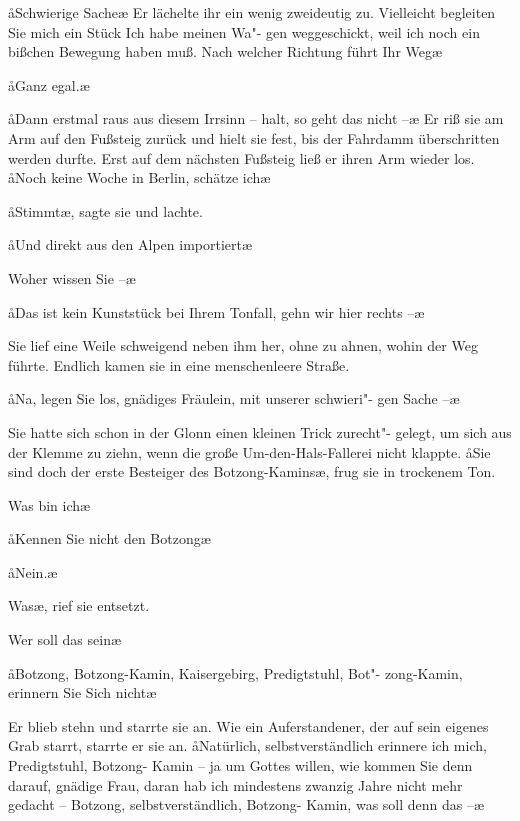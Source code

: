 \aa{}Schwierige Sache\frag{}\ae{} Er lächelte ihr ein wenig zweideutig zu.
\aanah{}Vielleicht begleiten Sie mich ein Stück\frag{} Ich habe meinen Wa"-%
gen weggeschickt, weil ich noch ein bißchen Bewegung haben
muß. Nach welcher Richtung führt Ihr Weg\frag{}\ae{}

\aa{}Ganz egal.\ae{}

\aa{}Dann erstmal raus aus diesem Irrsinn -- halt, so geht das
nicht --\ae{} Er riß sie am Arm auf den Fußsteig zurück und hielt
sie fest, bis der Fahrdamm überschritten werden durfte.
Erst auf dem nächsten Fußsteig ließ er ihren Arm wieder los.
\aa{}Noch keine Woche in Berlin, schätze ich\frag{}\ae{}

\aa{}Stimmt\ae{}, sagte sie und lachte.

\aa{}Und direkt aus den Alpen importiert\frag{}\ae{}

\aanah{}Woher wissen Sie --\ae{}

\aa{}Das ist kein Kunststück bei Ihrem Tonfall, gehn wir hier
rechts --\ae{}

Sie lief eine Weile schweigend neben ihm her, ohne zu ahnen,
wohin der Weg führte. Endlich kamen sie in eine menschenleere
Straße.

\aa{}Na, legen Sie los, gnädiges Fräulein, mit unserer schwieri"-%
gen Sache --\ae{}

Sie hatte sich schon in der Glonn einen kleinen Trick zurecht"-%
gelegt, um sich aus der Klemme zu ziehn, wenn die große
Um-den-Hals-Fallerei nicht klappte. \aa{}Sie sind doch der erste
Besteiger des Botzong-Kamins\ae{}, frug sie in trockenem Ton.

\aanah{}Was bin ich\frag{}\ae{}

\aa{}Kennen Sie nicht den Botzong\frag{}\ae{}

\aa{}Nein.\ae{}

\aanah{}Was\frag{}\ae{}, rief sie entsetzt.

\aanah{}Wer soll das sein\frag{}\ae{}

\aa{}Botzong, Botzong-Kamin, Kaisergebirg, Predigtstuhl, Bot"-%
zong-Kamin, erinnern Sie Sich\eingriff{eS71-1}{Sie Sich ] Sie sich} nicht\frag{}\ae{}

Er blieb stehn und starrte sie an. Wie ein Auferstandener,
der auf sein eigenes Grab starrt, starrte er sie an. \aa{}Natürlich,
selbstverständlich erinnere ich mich, Predigtstuhl, Botzong-%
Kamin -- ja um Gottes willen, wie kommen Sie denn darauf,
gnädige Frau, daran hab ich mindestens zwanzig Jahre
nicht mehr gedacht -- Botzong, selbstverständlich, Botzong-%
Kamin, was soll denn das --\ae{}

